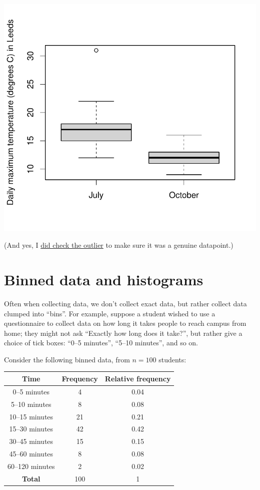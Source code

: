 \documentclass[
  a4paper,
]{book}
\theoremstyle{definition}
\theoremstyle{definition}
\theoremstyle{definition}
\theoremstyle{definition}
\theoremstyle{remark}
\begin{document}
\begin{center}\includegraphics{math1710_files/figure-latex/boxplot-temp-1} \end{center}

(And yes, I \href{https://www.metoffice.gov.uk/binaries/content/assets/metofficegovuk/pdf/weather/learn-about/uk-past-events/interesting/2020/2020_05_july_temperature.pdf}{did check the outlier} to make sure it was a genuine datapoint.)

\hypertarget{binned}{%
\section{Binned data and histograms}\label{binned}}

Often when collecting data, we don't collect exact data, but rather collect data clumped into ``bins''. For example, suppose a student wished to use a questionnaire to collect data on how long it takes people to reach campus from home; they might not ask ``Exactly how long does it take?'', but rather give a choice of tick boxes: ``0--5 minutes'', ``5--10 minutes'', and so on.

Consider the following binned data, from \(n = 100\) students:

\begin{longtable}[]{@{}ccc@{}}
\toprule
Time & Frequency & Relative frequency \\
\midrule
\endhead
0--5 minutes & 4 & 0.04 \\
5--10 minutes & 8 & 0.08 \\
10--15 minutes & 21 & 0.21 \\
15--30 minutes & 42 & 0.42 \\
30--45 minutes & 15 & 0.15 \\
45--60 minutes & 8 & 0.08 \\
60--120 minutes & 2 & 0.02 \\
\textbf{Total} & 100 & 1 \\
\bottomrule
\end{longtable}
\end{document}
